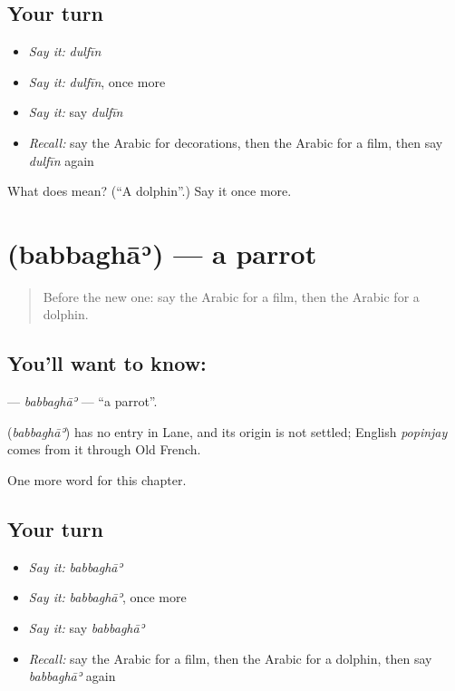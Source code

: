 \subsection*{Your turn}
\begin{itemize}
\raggedright
  \item \emph{Say it:} \emph{dulfīn}
  \item \emph{Say it:} \emph{dulfīn}, once more
  \item \emph{Say it:} say \emph{dulfīn}
  \item \emph{Recall:} say the Arabic for decorations, then the Arabic for a film, then say \emph{dulfīn} again
\end{itemize}

\begin{tcolorbox}[breakable,colback=teal!4,colframe=teal!35!black,title={Before you move on}]
What does  mean? (\textquotedblleft{}A dolphin\textquotedblright{}.) Say it once more.
\end{tcolorbox}
\section[\texorpdfstring{\ar{ببغاء} (babbaghāʾ)}{ببغاء (babbaghāʾ)}]{ (babbaghāʾ) — a parrot}

\label{lesson:AR-C185-babbagha}



\begin{quote}
Before the new one: say the Arabic for a film, then the Arabic for a dolphin.
\end{quote}

\subsection*{You'll want to know: }
\textbf{} — \emph{babbaghāʾ} — \textquotedblleft{}a parrot\textquotedblright{}.

\begin{cousinweb}
\textbf{} (\emph{babbaghāʾ}) has no entry in Lane, and its origin is not settled; English \emph{popinjay} comes from it through Old French.
\end{cousinweb}

\begin{grammarlens}[title={What you've built}]
One more word for this chapter.
\end{grammarlens}

\subsection*{Your turn}
\begin{itemize}
\raggedright
  \item \emph{Say it:} \emph{babbaghāʾ}
  \item \emph{Say it:} \emph{babbaghāʾ}, once more
  \item \emph{Say it:} say \emph{babbaghāʾ}
  \item \emph{Recall:} say the Arabic for a film, then the Arabic for a dolphin, then say \emph{babbaghāʾ} again
\end{itemize}

